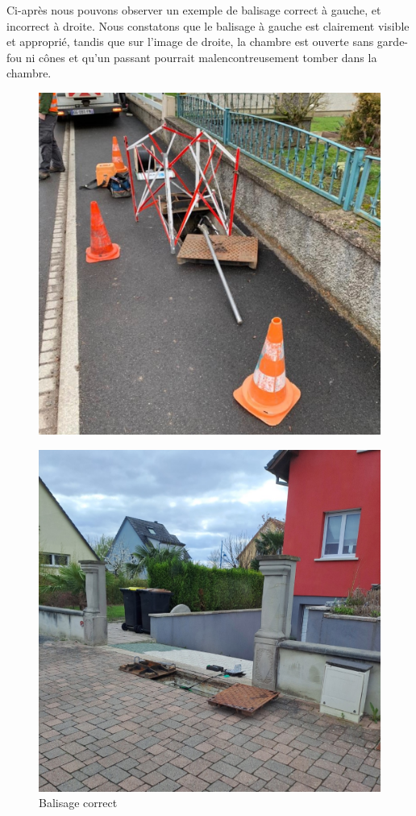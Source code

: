 \documentclass[12pt, a4paper]{article}
\begin{document}
Ci-après nous pouvons observer un exemple de balisage
correct à gauche, et incorrect à droite.
Nous constatons que le balisage à gauche est
clairement visible et approprié, tandis que 
sur l'image de droite, la chambre est ouverte
sans garde-fou ni cônes et qu'un passant pourrait 
malencontreusement tomber dans la chambre.\\
\begin{figure}[htbp]
    \centering
    \begin{minipage}[b]{0.4\textwidth}
		{\includegraphics[width=\textwidth]{img/bok.jpg}}
      \caption{Balisage correct}
    \end{minipage}
    \hspace{0.5cm} %
    \begin{minipage}[b]{0.4\textwidth}
      \includegraphics[width=\textwidth]{img/bpb.jpg}

\end{minipage}
\end{figure}
\end{document}
